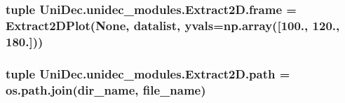 \subsubsection[{frame}]{\setlength{\rightskip}{0pt plus 5cm}tuple Uni\+Dec.\+unidec\+\_\+modules.\+Extract2\+D.\+frame = {\bf Extract2\+D\+Plot}(None, {\bf datalist}, yvals=np.\+array(\mbox{[}100., 120., 180.\mbox{]}))}\label{namespace_uni_dec_1_1unidec__modules_1_1_extract2_d_a82d38bf33b7bc117d5dfb661a8513458}
\hypertarget{namespace_uni_dec_1_1unidec__modules_1_1_extract2_d_a1901d7e3d20730f812e42060a3ac79d1}{}
\subsubsection[{path}]{\setlength{\rightskip}{0pt plus 5cm}tuple Uni\+Dec.\+unidec\+\_\+modules.\+Extract2\+D.\+path = os.\+path.\+join({\bf dir\+\_\+name}, {\bf file\+\_\+name})}\label{namespace_uni_dec_1_1unidec__modules_1_1_extract2_d_a1901d7e3d20730f812e42060a3ac79d1}

